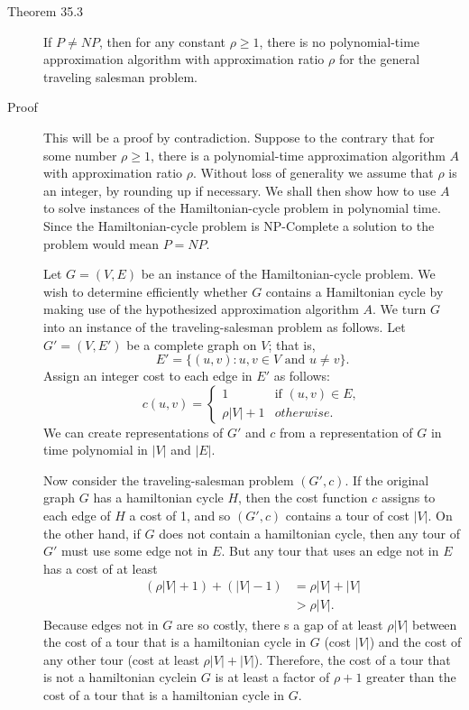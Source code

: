 \begin{description}
\item[Theorem 35.3] If $P\neq NP$, then for any constant $\rho \geq 1$, there is
  no polynomial-time approximation algorithm with approximation ratio $\rho$ for
  the general traveling salesman problem.

\item[Proof] This will be a proof by contradiction. Suppose to the contrary that
  for some number $\rho \geq 1$, there is a polynomial-time approximation
  algorithm $A$ with approximation ratio $\rho$. Without loss of generality we
  assume that $\rho$ is an integer, by rounding up if necessary.  We shall then
  show how to use $A$ to solve instances of the Hamiltonian-cycle problem in
  polynomial time. Since the Hamiltonian-cycle problem is NP-Complete a solution
  to the problem would mean $P=NP$.

  Let $G = (V,E)$ be an instance of the Hamiltonian-cycle problem. We wish to
  determine efficiently whether $G$ contains a Hamiltonian cycle by making use of
  the hypothesized approximation algorithm $A$.  We turn $G$ into an instance of
  the traveling-salesman problem as follows. Let $G' = (V,E')$ be a complete
  graph on $V$; that is,
  \[
    E' = \{(u,v) : u,v \in V \text{ and } u\neq v\}.
  \]
  Assign an integer cost to each edge in $E'$ as follows:
  \[
    c(u,v) = \begin{cases}
      1         & \text{if } (u,v) \in E,\\
      \rho|V|+1 & otherwise.
    \end{cases}
  \]
  We can create representations of $G'$ and $c$ from a representation of $G$ in
  time polynomial in $|V|$ and $|E|$.

  Now consider the traveling-salesman problem $(G',c)$. If the original graph
  $G$ has a hamiltonian cycle $H$, then the cost function $c$ assigns to each
  edge of $H$ a cost of 1, and so $(G',c)$ contains a tour of cost $|V|$. On the
  other hand, if $G$ does not contain a hamiltonian cycle, then any tour of $G'$
  must use some edge not in $E$.  But any tour that uses an edge not in $E$ has
  a cost of at least
  \begin{align*}
    (\rho|V|+1)+(|V|-1) &= \rho|V|+|V| \\
                        &> \rho|V|.
  \end{align*}
  Because edges not in $G$ are so costly, there s a gap of at least $\rho|V|$
  between the cost of a tour that is a hamiltonian cycle in $G$ (cost $|V|$) and
  the cost of any other tour (cost at least $\rho|V|+|V|$). Therefore, the cost
  of a tour that is not a hamiltonian cyclein $G$ is at least a factor of
  $\rho+1$ greater than the cost of a tour that is a hamiltonian cycle in $G$.


\end{description}
